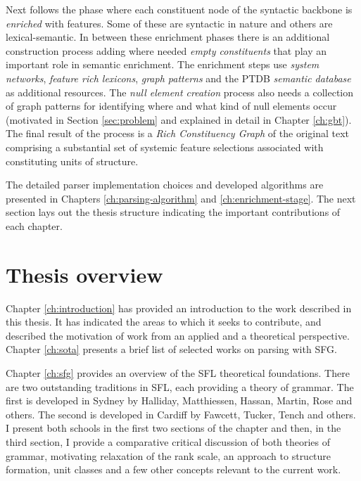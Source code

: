     Next follows the phase where each constituent node of the syntactic backbone is \textit{enriched} with features. Some of these are syntactic in nature and others are lexical-semantic. In between these enrichment phases there is an additional construction process adding where needed \textit{empty constituents} that play an important role in semantic enrichment. The enrichment steps use \textit{system networks}, \textit{feature rich lexicons}, \textit{graph patterns} and the PTDB \textit{semantic database} as additional resources. The \textit{null element creation} process also needs a collection of graph patterns for identifying where and what kind of null elements occur (motivated in Section \ref{sec:problem} and explained in detail in Chapter \ref{ch:gbt}). The final result of the process is a \textit{Rich Constituency Graph} of the original text comprising a substantial set of systemic feature selections associated with constituting units of structure. 
    
    The detailed parser implementation choices and developed algorithms are presented in Chapters \ref{ch:parsing-algorithm} and \ref{ch:enrichment-stage}. The next section lays out the thesis structure indicating the important contributions of each chapter.

\section{Thesis overview}
\label{sec:thesis-structure}
    
    Chapter \ref{ch:introduction} has provided an introduction to the work described in this thesis. It has indicated the areas to which it seeks to contribute, and described the motivation of work from an applied and a theoretical perspective. Chapter \ref{ch:sota} presents a brief list of selected works on parsing with SFG. 
    
    Chapter \ref{ch:sfg} provides an overview of the SFL theoretical foundations. There are two outstanding traditions in SFL, each providing a theory of grammar. The first is developed in Sydney by Halliday, Matthiessen, Hassan, Martin, Rose and others. The second is developed in Cardiff by Fawcett, Tucker, Tench and others. I present both schools in the first two sections of the chapter and then, in the third section, I provide a comparative critical discussion of both theories of grammar, motivating relaxation of the rank scale, an approach to structure formation, unit classes and a few other concepts relevant to the current work. 
    
